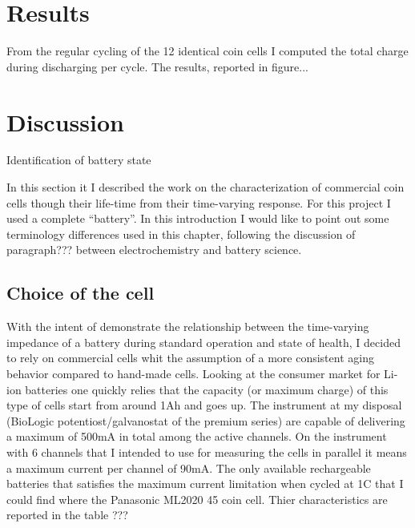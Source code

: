 \section{Results}
From the regular cycling of the 12 identical coin cells I computed the total charge during discharging per cycle. The results, reported in figure...

\section{Discussion}

























\newpage
Identification of battery state

In this section it I described the work on the characterization of commercial coin cells though their life-time from their time-varying response. 
For this project I used a complete “battery”. In this introduction I would like to point out some terminology differences used in this chapter, \colorbox{BurntOrange}{following the discussion of paragraph??? between electrochemistry and battery science.}

\subsection{Choice of the cell}
With the intent of demonstrate the relationship between the time-varying impedance of a battery during standard operation and state of health, I decided to rely on commercial cells whit the assumption of a more consistent aging behavior compared to hand-made cells. Looking at the consumer market for Li-ion batteries one quickly relies that the capacity (or maximum charge) of this type of cells start from around 1Ah and goes up. The instrument at my disposal (BioLogic potentiost/galvanostat of the premium series) are capable of delivering a maximum of  500mA in total among the active channels. On the instrument with 6 channels that I intended to use for measuring the cells in parallel it means a maximum current per channel of 90mA. The only available rechargeable batteries that satisfies the maximum current limitation when cycled at 1C that I could find where the Panasonic ML2020 45 coin cell. Thier characteristics are reported in the table ???

